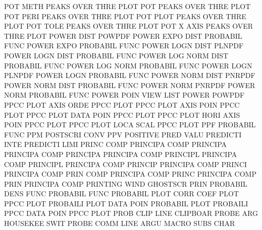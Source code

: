 POT      METH                           PEAKS    OVER THRE PLOT
POT                                     PEAKS    OVER THRE PLOT
POT      PERI                           PEAKS    OVER THRE PLOT
POT      PLOT                           PEAKS    OVER THRE PLOT
POT      TOLE                           PEAKS    OVER THRE PLOT
POT      X    AXIS                      PEAKS    OVER THRE PLOT
POWER    DIST                           POWPDF
POWER    EXPO DIST                      PROBABIL FUNC
POWER    EXPO                           PROBABIL FUNC
POWER    LOGN DIST                      PLNPDF
POWER    LOGN DIST                      PROBABIL FUNC
POWER    LOG  NORM DIST                 PROBABIL FUNC
POWER    LOG  NORM                      PROBABIL FUNC
POWER    LOGN                           PLNPDF
POWER    LOGN                           PROBABIL FUNC
POWER    NORM DIST                      PNRPDF
POWER    NORM DIST                      PROBABIL FUNC
POWER    NORM                           PNRPDF
POWER    NORM                           PROBABIL FUNC
POWER    POIN VIEW                      LIST
POWER                                   POWPDF
PPCC     PLOT AXIS ORDE                 PPCC     PLOT
PPCC     PLOT AXIS POIN                 PPCC     PLOT
PPCC     PLOT DATA POIN                 PPCC     PLOT
PPCC     PLOT HORI AXIS POIN            PPCC     PLOT
PPCC     PLOT LOCA SCAL                 PPCC     PLOT
PPF                                     PROBABIL FUNC
PPM                                     POSTSCRI CONV
PPV                                     POSITIVE PRED VALU
PREDICTI INTE                           PREDICTI LIMI
PRINC    COMP                           PRINCIPA COMP
PRINCIPA                                PRINCIPA COMP
PRINCIPA                                PRINCIPA COMP
PRINCIPL                                PRINCIPA COMP
PRINCIPL                                PRINCIPA COMP
PRINCIP                                 PRINCIPA COMP
PRINCI                                  PRINCIPA COMP
PRIN     COMP                           PRINCIPA COMP
PRINC                                   PRINCIPA COMP
PRIN                                    PRINCIPA COMP
PRINTING WIND                           GHOSTSCR PRIN
PROBABIL DENS FUNC                      PROBABIL FUNC
PROBABIL PLOT CORR COEF PLOT            PPCC     PLOT
PROBAILI PLOT DATA POIN                 PROBABIL PLOT
PROBAILI PPCC DATA POIN                 PPCC     PLOT
PROB     CLIP LINE                      CLIPBOAR
PROBE    ARG                            HOUSEKEE SWIT
PROBE    COMM LINE ARGU                 MACRO    SUBS CHAR
